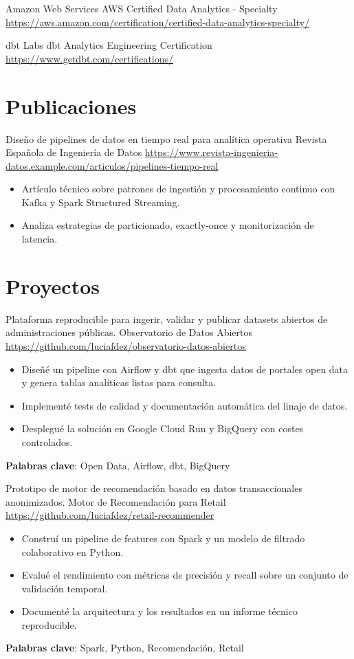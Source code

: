 \documentclass[a4paper, serif, 10pt]{moderncv}
\begin{document}
        {Amazon Web Services}
        {AWS Certified Data Analytics - Specialty}
        {\url{https://aws.amazon.com/certification/certified-data-analytics-specialty/}}
        {}
        {}

        {dbt Labs}
        {dbt Analytics Engineering Certification}
        {\url{https://www.getdbt.com/certifications/}}
        {}
        {}
\section{Publicaciones}

        {Diseño de pipelines de datos en tiempo real para analítica operativa}
        {Revista Española de Ingeniería de Datos}
        {\url{https://www.revista-ingenieria-datos.example.com/articulos/pipelines-tiempo-real}}
        {}
        {\begin{itemize}
\item Artículo técnico sobre patrones de ingestión y procesamiento continuo con Kafka y Spark Structured Streaming.
\item Analiza estrategias de particionado, exactly-once y monitorización de latencia.
\end{itemize}}
\section{Proyectos}

        {Plataforma reproducible para ingerir, validar y publicar datasets abiertos de administraciones públicas.}
        {Observatorio de Datos Abiertos}
        {\url{https://github.com/luciafdez/observatorio-datos-abiertos}}
        {}
        {\begin{itemize}
\item Diseñé un pipeline con Airflow y dbt que ingesta datos de portales open data y genera tablas analíticas listas para consulta.
\item Implementé tests de calidad y documentación automática del linaje de datos.
\item Desplegué la solución en Google Cloud Run y BigQuery con costes controlados.
\end{itemize}
\textbf{Palabras clave}: Open Data, Airflow, dbt, BigQuery}

        {Prototipo de motor de recomendación basado en datos transaccionales anonimizados.}
        {Motor de Recomendación para Retail}
        {\url{https://github.com/luciafdez/retail-recommender}}
        {}
        {\begin{itemize}
\item Construí un pipeline de features con Spark y un modelo de filtrado colaborativo en Python.
\item Evalué el rendimiento con métricas de precisión y recall sobre un conjunto de validación temporal.
\item Documenté la arquitectura y los resultados en un informe técnico reproducible.
\end{itemize}
\textbf{Palabras clave}: Spark, Python, Recomendación, Retail}
\end{document}
